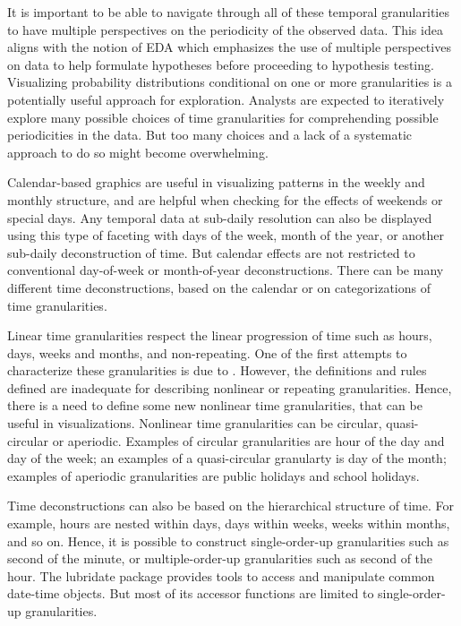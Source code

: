 \documentclass[12pt]{article}
\begin{document}
It is important to be able to navigate through all of these temporal granularities to have multiple perspectives on the periodicity of the observed data. This idea aligns with the notion of EDA \citep{Tukey1977-jx} which emphasizes the use of multiple perspectives on data to help formulate hypotheses before proceeding to hypothesis testing. Visualizing probability distributions conditional on one or more granularities is a potentially useful approach for exploration. Analysts are expected to iteratively explore many possible choices of time granularities for comprehending possible periodicities in the data. But too many choices and a lack of a systematic approach to do so might become overwhelming.

Calendar-based graphics \citep{wang2018calendar} are useful in visualizing patterns in the weekly and monthly structure, and are helpful when checking for the effects of weekends or special days. Any temporal data at sub-daily resolution can also be displayed using this type of faceting \citep{Wickham2009pk} with days of the week, month of the year, or another sub-daily deconstruction of time. But calendar effects are not restricted to conventional day-of-week or month-of-year deconstructions. There can be many different time deconstructions, based on the calendar or on categorizations of time granularities.

Linear time granularities respect the linear progression of time such as hours, days, weeks and months, and non-repeating. One of the first attempts to characterize these granularities is due to \citet{Bettini1998-ed}. However, the definitions and rules defined are inadequate for describing nonlinear or repeating granularities. Hence, there is a need to define some new nonlinear time granularities, that can be useful in visualizations. Nonlinear time granularities can be circular, quasi-circular or aperiodic. Examples of circular granularities are hour of the day and day of the week; an examples of a quasi-circular granularty is day of the month; examples of aperiodic granularities are public holidays and school holidays.

Time deconstructions can also be based on the hierarchical structure of time. For example, hours are nested within days, days within weeks, weeks within months, and so on. Hence, it is possible to construct single-order-up granularities such as second of the minute, or multiple-order-up granularities such as second of the hour. The lubridate package \citep{G_Grolemund2011-vm} provides tools to access and manipulate common date-time objects. But most of its accessor functions are limited to single-order-up granularities.
\end{document}
